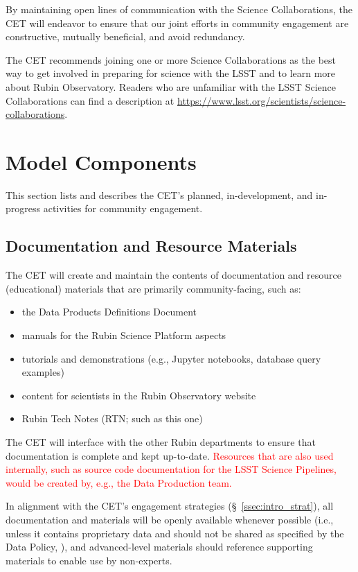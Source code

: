 \documentclass[DM,lsstdraft,toc]{lsstdoc}
\begin{document}
By maintaining open lines of communication with the Science Collaborations, the CET will endeavor to ensure that our joint efforts in community engagement are constructive, mutually beneficial, and avoid redundancy.

The CET recommends joining one or more Science Collaborations as the best way to get involved in preparing for science with the LSST and to learn more about Rubin Observatory.
Readers who are unfamiliar with the LSST Science Collaborations can find a description at \url{https://www.lsst.org/scientists/science-collaborations}.



\section{Model Components}\label{sec:mod}

This section lists and describes the CET's planned, in-development, and in-progress activities for community engagement. 


\subsection{Documentation and Resource Materials}\label{ssec:mod_docs}

The CET will create and maintain the contents of documentation and resource (educational) materials that are primarily community-facing, such as:
\begin{itemize}
\item the Data Products Definitions Document 
\item manuals for the Rubin Science Platform aspects
\item tutorials and demonstrations (e.g., Jupyter notebooks, database query examples)
\item content for scientists in the Rubin Observatory website
\item Rubin Tech Notes (RTN; such as this one)
\end{itemize}

The CET will interface with the other Rubin departments to ensure that documentation is complete and kept up-to-date.
\textcolor{red}{Resources that are also used internally, such as source code documentation for the LSST Science Pipelines, would be created by, e.g., the Data Production team.} 

In alignment with the CET's engagement strategies (\S~\ref{ssec:intro_strat}), all documentation and materials will be openly available whenever possible (i.e., unless it contains proprietary data and should not be shared as specified by the Data Policy, ), and advanced-level materials should reference supporting materials to enable use by non-experts.
\end{document}
